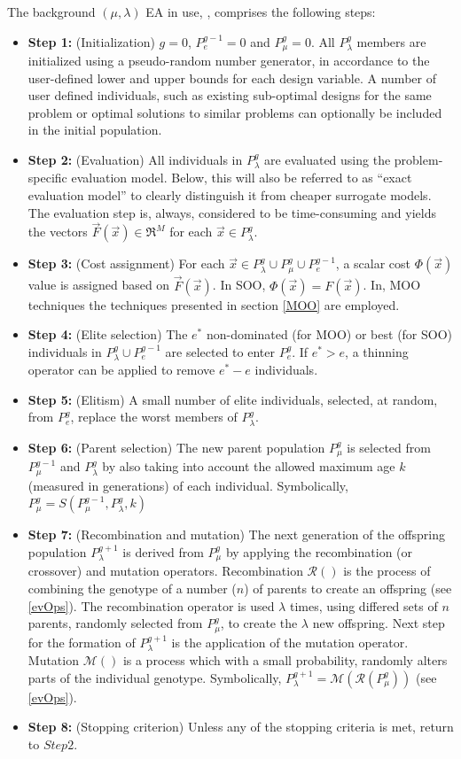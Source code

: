 The background $(\mu,\lambda)$ EA in use, \cite{phd_Giotis}, comprises the following steps:
\begin{itemize}
\item[]{\bf Step 1:}  (Initialization) $g=0$, $P_{e}^{g-1}=0$ and $P_{\mu}^g=0$. All $P_{\lambda}^g$  members are initialized using a pseudo-random number generator, in accordance to the user-defined lower and upper bounds for each design variable. A number of user defined individuals, such as existing sub-optimal designs for the same problem or optimal solutions to similar problems can optionally be included in the initial population. 
\item[]{\bf Step 2:}  (Evaluation) All individuals in $P_{\lambda}^g$ are evaluated using the problem-specific evaluation model. Below, this will also be referred to as ``exact evaluation model'' to clearly distinguish it from cheaper surrogate models. The evaluation step is, always, considered to be time-consuming and yields the vectors $\vec{F}(\vec{x}) \in \Re^{M} $ for each $\vec{x} \in P_{\lambda}^g$.
\item[]{\bf Step 3:}  (Cost assignment) For each $\vec{x} \in P_{\lambda}^g \cup P_{\mu}^g \cup P_{e}^{g-1}$, a scalar cost $\Phi(\vec{x})$ value is assigned based on $\vec{F}(\vec{x})$. In SOO, $\Phi(\vec{x})=F(\vec{x})$. In, MOO techniques the techniques presented in section \ref{MOO} are employed. 
\item[]{\bf Step 4:}  (Elite selection) The $e^*$ non-dominated (for MOO) or best (for SOO) individuals in $P_{\lambda}^g \cup P_{e}^{g-1}$ are selected to enter $P_e^g$. If $e^*\!>\!e$, a thinning operator \cite{phd_Giotis} can be applied to remove $e^*\!-\!e$ individuals.     
\item[]{\bf Step 5:}  (Elitism) A small number of elite individuals, selected, at random, from $P_e^g$, replace the worst members of $P_{\lambda}^g$.  
\item[]{\bf Step 6:}  (Parent selection) The new parent population $P_{\mu}^{g}$ is selected from $P_{\mu}^{g-1}$ and $P_{\lambda}^g$ by also taking into account the allowed maximum age  $k$ (measured in generations) of each individual. Symbolically, $P_{\mu}^{g}=S(P_{\mu}^{g-1},P_{\lambda}^g,k)$ 
\item[]{\bf Step 7:}  (Recombination and mutation) The next generation of the offspring population $P_{\lambda}^{g+1}$ is derived from 
$P_{\mu}^{g}$  by applying the recombination (or crossover) and mutation operators. Recombination $\mathcal{R}()$ is the process of combining the genotype of a number ($n$) of parents to create an offspring (see \ref{evOps}). The recombination operator is used $\lambda$ times, using differed sets of $n$ parents, randomly selected from $P_{\mu}^{g}$,  to create the $\lambda$ new offspring. Next step for the formation of $P_{\lambda}^{g+1}$ is the application of the mutation operator. Mutation $\mathcal{M}()$ is a process which with a small probability, randomly alters parts of the individual genotype. Symbolically, $P_{\lambda}^{g+1} = \mathcal{M}(\mathcal{R}(P_{\mu}^{g}))$ (see \ref{evOps}).
\item[]{\bf Step 8:}  (Stopping criterion) Unless any of the stopping criteria is met, return to $Step 2$.
\end{itemize}


